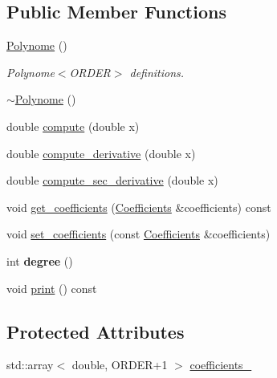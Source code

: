 \subsection*{Public Member Functions}
\begin{DoxyCompactItemize}
\item 
\hyperlink{classblmc__robots_1_1Polynome_a8ece7a7021cc62167c023d51a5bb3879}{Polynome} ()
\begin{DoxyCompactList}\small\item\em Polynome$<$\+O\+R\+D\+E\+R$>$ definitions. \end{DoxyCompactList}\item 
\hyperlink{classblmc__robots_1_1Polynome_a4541e4b629061dfdbca73559a42a6e93}{$\sim$\+Polynome} ()
\item 
double \hyperlink{classblmc__robots_1_1Polynome_ae102191e0f730744e822c8e7599008d6}{compute} (double x)
\item 
double \hyperlink{classblmc__robots_1_1Polynome_a62183ec0d1bc22c224c14a58dd10e3e9}{compute\+\_\+derivative} (double x)
\item 
double \hyperlink{classblmc__robots_1_1Polynome_a6a20495bd6c6105b5109244b29b5d069}{compute\+\_\+sec\+\_\+derivative} (double x)
\item 
void \hyperlink{classblmc__robots_1_1Polynome_a18cb2a487969b07ee8a8f8826f991d5d}{get\+\_\+coefficients} (\hyperlink{classblmc__robots_1_1Polynome_a31e086184f3934b269e8318cce2859eb}{Coefficients} \&coefficients) const
\item 
void \hyperlink{classblmc__robots_1_1Polynome_ad8daa2f5ffa1891aac2663519950afae}{set\+\_\+coefficients} (const \hyperlink{classblmc__robots_1_1Polynome_a31e086184f3934b269e8318cce2859eb}{Coefficients} \&coefficients)
\item 
\mbox{\label{classblmc__robots_1_1Polynome_ada7f56fa60b0d23dd0ab9fedbbc1e0db}} 
int {\bfseries degree} ()
\item 
void \hyperlink{classblmc__robots_1_1Polynome_ab814c435b1917c8eb12e3d28f15ae81a}{print} () const
\end{DoxyCompactItemize}
\subsection*{Protected Attributes}
\begin{DoxyCompactItemize}
\item 
std\+::array$<$ double, O\+R\+D\+ER+1 $>$ \hyperlink{classblmc__robots_1_1Polynome_a975d6e6bbcbc05f1a31a5237f28b7bee}{coefficients\+\_\+}
\end{DoxyCompactItemize}

